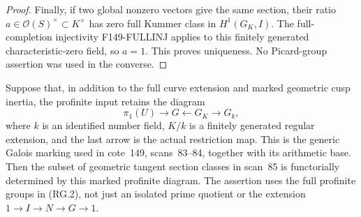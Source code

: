 \begin{proof}
Finally, if two global nonzero vectors give the same section,
their ratio $a\in\mathcal O(S)^\times\subset K^\times$ has zero
full Kummer class in $H^1(G_K,I)$. The full-completion injectivity
F149-FULLINJ applies to this finitely generated characteristic-zero
field, so $a=1$. This proves uniqueness. No Picard-group assertion
was used in the converse.
\end{proof}

\begin{proposition}
\label{prop:archive-marked-recognition}
Suppose that, in addition to the full curve extension and marked
geometric cusp inertia, the profinite input retains the diagram
\[
 \pi_1(U)\longrightarrow G\longleftarrow G_K
     \longrightarrow G_k,                                  \tag{RG.2}
\]
where $k$ is an identified number field, $K/k$ is a finitely
generated regular extension, and the last arrow is the actual
restriction map. This is the generic Galois marking used in
cote~149, scans~83--84, together with its arithmetic base.
Then the subset of geometric tangent section classes in scan~85
is functorially determined by this marked profinite diagram.
The assertion uses the full profinite groups in \textup{(RG.2)},
not just an isolated prime quotient or the extension $1\to I\to N\to G\to1$.
\end{proposition}

